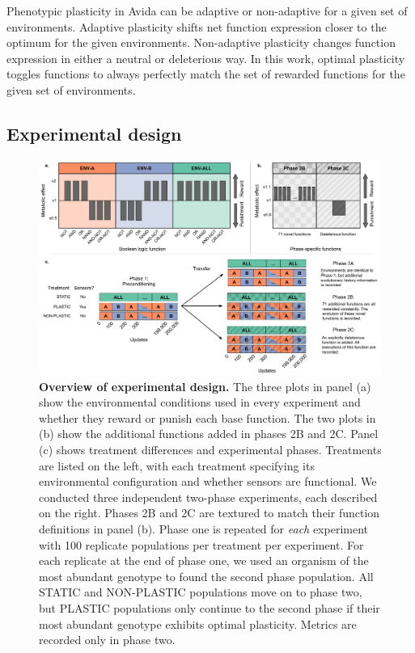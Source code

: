 \documentclass[utf8]{frontiersSCNS} %
\begin{document}
\begin{raggedbottom}
Phenotypic plasticity in Avida can be adaptive or non-adaptive for a given set of environments.
Adaptive plasticity shifts net function expression closer to the optimum for the given environments.
Non-adaptive plasticity changes function expression in either a neutral or deleterious way.
In this work, optimal plasticity toggles functions to always perfectly match the set of rewarded functions for the given set of environments.

\subsection{Experimental design}
\label{sec:methods:experiment}

\begin{figure}[h!]
  \centering
  \includegraphics[width=1\textwidth]{media-experimental-design.pdf}
  \caption{\small
  \textbf{Overview of experimental design.}
  The three plots in panel (a) show the environmental conditions used in every experiment and whether they reward or punish each base function.
  The two plots in (b) show the additional functions added in phases 2B and 2C. %
  Panel (c) shows treatment differences and experimental phases.
  Treatments are listed on the left, with each treatment specifying its environmental configuration and whether sensors are functional.
  We conducted three independent two-phase experiments, each described on the right.
  Phases 2B and 2C are textured to match their function definitions in panel (b).
  Phase one is repeated for \textit{each} experiment with 100 replicate populations per treatment per experiment.
  For each replicate at the end of phase one, we used an organism of the most abundant genotype to found the second phase population.
  All STATIC and NON-PLASTIC populations move on to phase two, but PLASTIC populations only continue to the second phase if their most abundant genotype exhibits optimal plasticity.
  Metrics are recorded only in phase two.
  }
  \label{fig:experimental-design}
\end{figure}


\end{raggedbottom}
\end{document}
